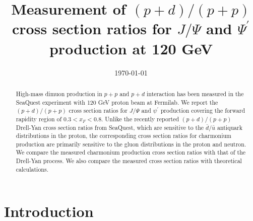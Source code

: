 \documentclass[twocolumn,aps,unsortedaddress,superscriptaddress,prd,floatfix,showpacs,linenumbers]{revtex4-2}
\begin{document}
\title{Measurement of $(p+d) / (p+p)$ cross section ratios for
$J/\Psi$ and $\Psi^\prime$ production at 120 GeV}


\date{\today}
\begin{abstract}
High-mass dimuon production in $p+p$ and $p+d$ interaction has been measured
in the SeaQuest experiment with 120 GeV proton beam at Fermilab.
We report the $(p+d) / (p+p)$ cross section
ratios for $J/\Psi$ and $\psi^\prime$ production covering the forward
rapidity region of $0.3 < x_F <0.8$. Unlike the recently reported
$(p+d) / (p+p)$ Drell-Yan cross section ratios from SeaQuest, which are
sensitive to the
$\bar d / \bar u$ antiquark distributions in the proton, the corresponding
cross section ratios for charmonium production are primarily
sensitive to the gluon
distributions in the proton and neutron. We compare the measured
charmonium production cross section ratios with that of the
Drell-Yan process. We also compare the measured cross section ratios with
theoretical calculations.
\end{abstract}


\maketitle
\section{Introduction}
\nocite{*}


\end{document}

